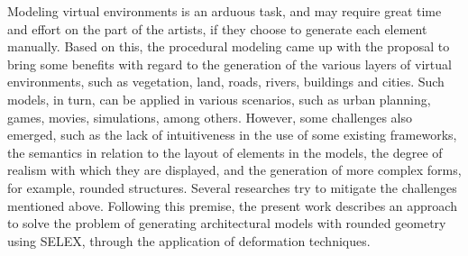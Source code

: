 Modeling virtual environments is an arduous task, and may require great time and effort on the part of the artists, if they choose to generate each element manually. Based on this, the procedural modeling came up with the proposal to bring some benefits with regard to the generation of the various layers of virtual environments, such as vegetation, land, roads, rivers, buildings and cities. Such models, in turn, can be applied in various scenarios, such as urban planning, games, movies, simulations, among others. However, some challenges also emerged, such as the lack of intuitiveness in the use of some existing frameworks, the semantics in relation to the layout of elements in the models, the degree of realism with which they are displayed, and the generation of more complex forms, for example, rounded structures. Several researches try to mitigate the challenges mentioned above. Following this premise, the present work describes an approach to solve the problem of generating architectural models with rounded geometry using \gls{SELEX}, through the application of deformation techniques.

